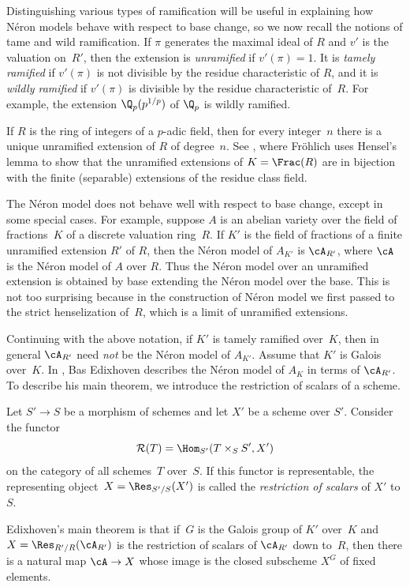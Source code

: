 \documentclass{report}
\begin{document}
Distinguishing various types of ramification will be useful in
explaining how N\'eron models behave with respect to base change,
so we now recall the notions of tame and wild ramification. If
$\pi$ generates the maximal ideal of $R$ and $v'$ is the valuation
on~$R'$, then the extension is {\em unramified} if $v'(\pi)=1$. It
is {\em tamely ramified} if $v'(\pi)$ is not divisible by the
residue characteristic of $R$, and it is {\em wildly ramified} if
$v'(\pi)$ is divisible by the residue characteristic of~$R$.  For
example, the extension $\Q_p(p^{1/p})$ of $\Q_p$ is wildly
ramified.

\begin{example}If $R$ is the ring of integers of a $p$-adic field, then for
every integer~$n$ there is a unique unramified extension of $R$ of
degree~$n$.  See \cite[\S{}I.7]{cassels-frohlich}, where
Fr\"ohlich uses Hensel's lemma to show that the unramified
extensions of $K=\Frac(R)$ are in bijection with the finite
(separable) extensions of the residue class field.
\end{example}

The N\'eron model does not behave well with respect to base
change, except in some special cases.  For example, suppose $A$ is
an abelian variety over the field of fractions~$K$ of a discrete
valuation ring~$R$.  If $K'$ is the field of fractions of a finite
unramified extension $R'$ of $R$, then the N\'eron model of
$A_{K'}$ is $\cA_{R'}$, where $\cA$ is the N\'eron model of $A$
over $R$.  Thus the N\'eron model over an unramified extension is
obtained by base extending the N\'eron model over the base.  This
is not too surprising because in the construction of N\'eron model
we first passed to the strict henselization of~$R$, which is a
limit of unramified extensions.

Continuing with the above notation, if $K'$ is tamely ramified
over~$K$, then in general $\cA_{R'}$ need {\em not} be the N\'eron
model of $A_{K'}$.  Assume that $K'$ is Galois over~$K$.  In
\cite{edixhoven:tame}, Bas Edixhoven describes the N\'eron model
of $A_K$ in terms of $\cA_{R'}$.  To describe his main theorem, we
introduce the restriction of scalars of a scheme.

\begin{definition}
Let $S'\to S$ be a morphism of schemes and let $X'$ be a scheme
over $S'$.  Consider the functor $$\mathcal{R}(T) =
\Hom_{S'}(T\times_S S', X')$$ on the category of all schemes~$T$
over~$S$. If this functor is representable, the representing
object~$X=\Res_{S'/S}(X')$ is called the {\em restriction of
scalars} of $X'$ to $S$.
\end{definition}
Edixhoven's main theorem is that if~$G$ is the Galois group of
$K'$ over~$K$ and $X=\Res_{R'/R}(\cA_{R'})$ is the restriction of
scalars of $\cA_{R'}$ down to~$R$, then there is a natural map
$\cA\to X$ whose image is the closed subscheme $X^G$ of fixed
elements.
\end{document}
